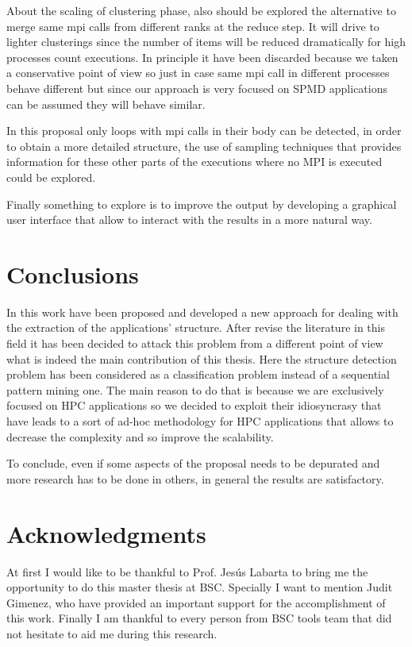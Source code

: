About the scaling of clustering phase, also should be explored the alternative
to merge same mpi calls from different ranks at the reduce step. It will drive
to lighter clusterings since the number of items will be reduced dramatically
for high processes count executions. In principle it
have been discarded because we taken a conservative point of view so 
just in case same mpi call in different processes behave different but
since our approach is very focused on SPMD applications can be assumed they will
behave similar.

In this proposal only loops with mpi calls in their body can be detected, in
order to obtain a more detailed structure, the use of sampling techniques that
provides information for these other parts of the executions where no MPI is
executed could be explored.

Finally something to explore is to improve the output by developing a graphical
user interface that allow to interact with the results in a more natural way.

\section{Conclusions}

In this work have been proposed and developed a new approach for dealing with
the extraction of the applications' structure. After revise the literature in
this field it has been decided to attack this problem from a different point of
view what is indeed the main contribution of this thesis. Here the structure 
detection problem has been considered as a classification problem instead of 
a sequential pattern mining one. The main reason to do that is because we are 
exclusively
focused on HPC applications so we decided to exploit their 
idiosyncrasy that have leads to a sort of ad-hoc methodology for HPC applications 
that allows to decrease the complexity and so improve the scalability.  

To conclude, even if some aspects of the proposal needs to be depurated and more
research has to be done in others, in general the results are satisfactory.

\section{Acknowledgments}

At first I would like to be thankful to Prof. Jes\'us Labarta to bring me the 
opportunity to do this master thesis at BSC. Specially I want to mention
Judit Gimenez, who have provided an important support for the accomplishment of this
work. Finally I am thankful to every person from BSC tools team that did not
hesitate to aid me during this research.
